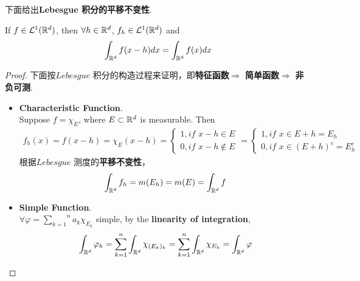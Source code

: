 	\vspace{2em}
	下面给出\textbf{Lebesgue 积分的平移不变性}.
	\begin{thm}\label{thm 3.3.1}
		If $f \in \mathcal{L}^{1}(\mathbb{R}^d)$, then $\forall h \in \mathbb{R}^d$, $f_h \in \mathcal{L}^{1}(\mathbb{R}^d)$ and
		\begin{align}
			\int_{\mathbb{R}^d}{f(x - h) dx} = \int_{\mathbb{R}^d}{f(x) dx}
		\end{align}
	
		\vspace{2em}
		\begin{proof}
			下面按$Lebesgue$ 积分的构造过程来证明，即\textbf{特征函数}$\Rightarrow$ \textbf{简单函数}$\Rightarrow$ \textbf{非负可测}.
			\begin{itemize}
				\item \textbf{Characteristic Function}. \\
				Suppose $f = \chi_E$, where $E \subset \mathbb{R}^d$ is measurable. Then
				\begin{align}
					f_{h}(x) = f(x - h) = \chi_{E}(x - h) = 
					\begin{cases}
						1 , if \,\, x - h \in E \\
						0 , if \,\, x - h \notin E
					\end{cases}
				 	= 
				 	\begin{cases}
				 		1 , if \,\, x \in E + h = E_h \\
				 		0 , if \,\, x \in (E + h)^c = E_{h}^c
				 	\end{cases}
				\end{align}
				根据$Lebesgue$ 测度的\textbf{平移不变性}，
				\begin{align}
					\int_{\mathbb{R}^d}{f_h} = m(E_h) = m(E) = \int_{\mathbb{R}^d}{f}
				\end{align}
			
				\vspace{2em}
				\item \textbf{Simple Function}. \\
				$\forall \varphi = \overset{n}{\underset{k = 1}{\sum}}{a_k \chi_{E_k}}$ simple, by the \textbf{linearity of integration},
				\begin{align}
					\int_{\mathbb{R}^d}{\varphi_h} = \sum_{k = 1}^{n}{\int_{\mathbb{R}^d}{\chi_{(E_k)_h}}} = \sum_{k = 1}^{n}{\int_{\mathbb{R}^d}{\chi_{E_k}}} = \int_{\mathbb{R}^d}{\varphi}
				\end{align}
			

\end{itemize}
\end{proof}
\end{thm}
